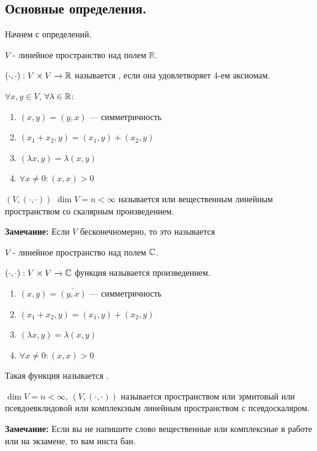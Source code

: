 \subsection{Основные определения.}

Начнем с определений. 

 $V$ - линейное пространство над полем $\mathbb{R}$.

$(\cdot, \cdot ): V\times V \xrightarrow{} \mathbb{R}$ называется , если она удовлетворяет 4-ем аксиомам.

$\forall x,y \in V$, $\forall \lambda \in \mathbb{R}$:

\begin{enumerate}
    \item $(x,y) = (y,x)$ --- симметричность
    \item $(x_1 +x_2,y) = (x_1,y)+(x_2,y)$
    \item $(\lambda x, y) = \lambda (x,y)$
    \item $\forall x \neq 0: (x,x)>0$
\end{enumerate}

 $(V, (\cdot, \cdot))$ $\dim V =n<\infty$ называется  или вещественным линейным пространством со скалярным произведением.

\textbf{Замечание:} Если $V$ бесконечномерно, то это называется 

 $V$ - линейное пространство над полем $\mathbb{C}$.

$(\cdot, \cdot): V\times V \xrightarrow{} \mathbb{C}$ функция называется  произведением.

\begin{enumerate}
    \item $(x,y) = \overline{(y,x)}$ --- симметричность
    \item $(x_1 +x_2,y) = (x_1,y)+(x_2,y)$
    \item $(\lambda x, y) = \lambda (x,y)$
    \item $\forall x \neq 0: (x,x)>0$
\end{enumerate}

Такая функция называется .

 $\dim V = n < \infty$, $(V, (\cdot, \cdot))$ называется  пространством или эрмитовый или псевдоевклидовой или комплексным линейным пространством с псевдоскаляром.

\textbf{Замечание:} Если вы не напишите слово вещественные или комплексные в работе или на экзамене, то вам инста бан.

